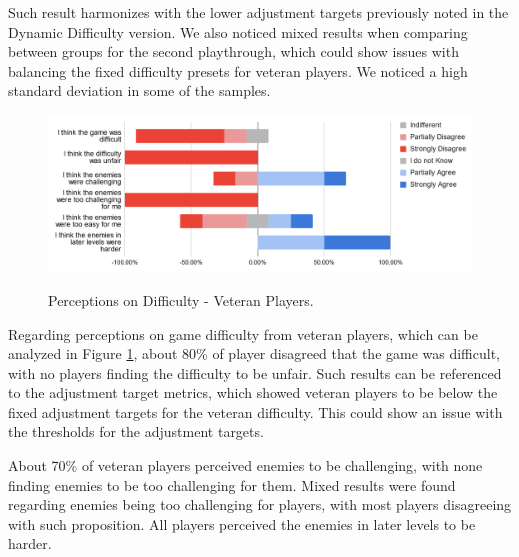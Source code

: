 Such result harmonizes with the lower adjustment targets previously noted in the Dynamic Difficulty version. We also noticed mixed results when comparing between groups for the second playthrough, which could show issues with balancing the fixed difficulty presets for veteran players. We noticed a high standard deviation in some of the samples.


\begin{figure}[!ht]
    \begin{center}
    \caption{Perceptions on Difficulty - Veteran Players.}
        \includegraphics[width=36em]{figures/fig-perception-difficulty-veteran-players.png}
        \label{fig:perception-difficulty-veteran-players}
    \end{center}
\end{figure}


Regarding perceptions on game difficulty from veteran players, which can be analyzed in Figure \ref{fig:perception-difficulty-veteran-players}, about 80\% of player disagreed that the game was difficult, with no players finding the difficulty to be unfair. Such results can be referenced to the adjustment target metrics, which showed veteran players to be below the fixed adjustment targets for the veteran difficulty. This could show an issue with the thresholds for the adjustment targets.

About 70\% of veteran players perceived enemies to be challenging, with none finding enemies to be too challenging for them. Mixed results were found regarding enemies being too challenging for players, with most players disagreeing with such proposition. All players perceived the enemies in later levels to be harder.

